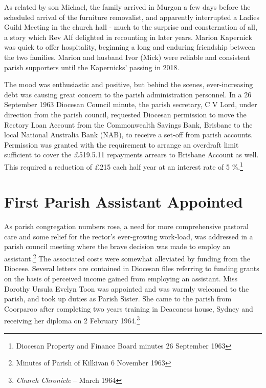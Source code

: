 As related by son Michael, the family arrived in Murgon a few days before the scheduled arrival of the furniture removalist, and apparently interrupted a Ladies Guild Meeting in the church hall - much to the surprise and consternation of all, a story which Rev Alf delighted in recounting in later years. Marion Kapernick was quick to offer hospitality, beginning a long and enduring friendship between the two families. Marion and husband Ivor (Mick) were reliable and consistent parish supporters until the Kapernicks' passing in 2018.



The mood was enthusiastic and positive, but behind the scenes, ever-increasing debt was causing great concern to the parish administration personnel. In a 26 September 1963 Diocesan Council minute, the parish secretary, C V Lord, under direction from the parish council, requested Diocesan permission to move the Rectory Loan Account from the Commonwealth Savings Bank, Brisbane to the local National Australia Bank (NAB), to receive a set-off from parish accounts. Permission was granted with the requirement to arrange an overdraft limit sufficient to cover the \pounds519.5.11 repayments arrears to Brisbane Account as well. This required a reduction of \pounds215 each half year at an interest rate of 5  \%.\footnote{Diocesan Property and Finance Board minutes 26 September 1963}


\section{First Parish Assistant Appointed}



As parish congregation numbers rose, a need for more comprehensive pastoral care and some relief for the rector's ever-growing work-load, was addressed in a parish council meeting where the brave decision was made to employ an assistant.\footnote{Minutes of Parish of Kilkivan 6 November 1963} The associated costs were somewhat alleviated by funding from the Diocese. Several letters are contained in Diocesan files referring to funding grants on the basis of perceived income gained from employing an assistant. Miss Dorothy Ursula Evelyn Toon was appointed and was warmly welcomed to the parish, and took up duties as Parish Sister. She came to the parish from Coorparoo after completing two years training in Deaconess house, Sydney and receiving her diploma on 2 February 1964.\footnote{\emph{Church Chronicle} -- March 1964}


